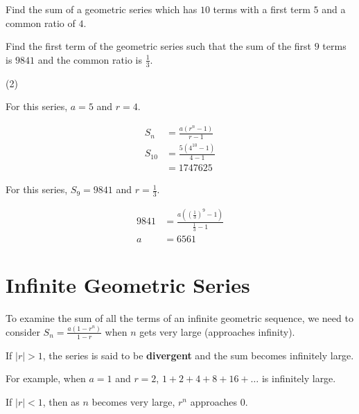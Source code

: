 \documentclass[11pt,a4paper]{book}
\begin{document}
\begin{example}

\begin{tasks}[label=(\alph*),label-width=3.5ex]

\task  Find the sum of a geometric series which has $10$ terms with a first term $5$ and a common ratio of $4$.

\task  Find the first term of the geometric series such that the
sum of the first $9$ terms is $9841$ and the common ratio is ${\displaystyle \frac{1}{3}}$.

\end{tasks}

\Solution

\begin{tasks}[label=(\alph*),label-width=3.5ex](2)

\task For this series, $a=5$ and $r=4$.

\begin{align*}
S_{n} & =\frac{a\left(r^{n}-1\right)}{r-1}\\
S_{10} & =\frac{5\left(4^{10}-1\right)}{4-1}\\
 & =1747625
\end{align*}

\task  For this series, $S_{9}=9841$ and ${\displaystyle r=\frac{1}{3}}$.

\begin{align*}
9841 & =\frac{a\left(\left(\frac{1}{3}\right)^{9}-1\right)}{\frac{1}{3}-1}\\
a & =6561
\end{align*}

\end{tasks}

\end{example}


\section{Infinite Geometric Series}

To examine the sum of all the terms of an infinite geometric sequence, we need to consider ${\displaystyle S_{n}=\frac{a\left(1-r^{n}\right)}{1-r}}$ when $n$ gets very large (approaches infinity).

If $\left|r\right|>1$, the series is said to be \textbf{divergent}
and the sum becomes infinitely large.

For example, when $a=1$ and $r=2$, $1+2+4+8+16+\ldots$ is infinitely large.

If $\left|r\right|<1$, then as $n$ becomes very large, $r^{n}$
approaches $0$.
\end{document}
